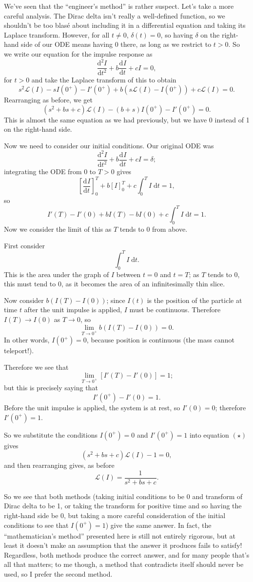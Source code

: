 \documentclass{article}
\newcommand{\deriv}[3][]{\frac{\mathrm{d}^{#1}#2}{\mathrm{d}#3^{#1}}}
\newcommand{\diff}{\;\mathrm{d}}
\begin{document}
We've seen that the ``engineer's method'' is rather suspect. Let's take a more careful analysis. The Dirac delta isn't really a well-defined function, so we shouldn't be too blas{\'e} about including it in a differential equation and taking its Laplace transform. However, for all $t\neq 0$, $\delta(t)=0$, so having $\delta$ on the right-hand side of our ODE means having 0 there, as long as we restrict to $t>0$. So we write our equation for the impulse response as
\[\deriv[2]{I}{t}+b\deriv{I}{t}+cI=0,\]
for $t>0$ and take the Laplace transform of this to obtain
\[s^2\mathcal{L}(I)-sI(0^+)-I'(0^+)+b\left(s\mathcal{L}(I)-I(0^+)\right) + c\mathcal{L}(I)=0.\]
Rearranging as before, we get
\begin{equation}
(s^2+bs+c)\mathcal{L}(I)-(b+s)I(0^+) - I'(0^+)=0.\tag{$\star$}
\end{equation}
This is almost the same equation as we had previously, but we have 0 instead of 1 on the right-hand side.

Now we need to consider our initial conditions. Our original ODE was
\[\deriv[2]{I}{t}+b\deriv{I}{t}+cI=\delta;\]
integrating the ODE from 0 to $T>0$ gives
\[\left[\deriv{I}{t}\right]_0^T + b\left[I\right]_0^T + c\int_0^T I\diff t=1,\]
so
\[I'(T)-I'(0)+bI(T)-bI(0)+c\int_0^T I\diff t = 1.\]
Now we consider the limit of this as $T$ tends to 0 from above.

First consider
\[\int_0^T I\diff t.\]
This is the area under the graph of $I$ between $t=0$ and $t=T$; as $T$ tends to 0, this must tend to 0, as it becomes the area of an infinitesimally thin slice.

Now consider $b(I(T)-I(0))$; since $I(t)$ is the position of the particle at time $t$ after the unit impulse is applied, $I$ must be continuous. Therefore $I(T)\to I(0)$ as $T\to 0$, so
\[\lim_{T\to 0^+} b(I(T)-I(0)) = 0.\]
In other words, $I(0^+)=0$, because position is continuous (the mass cannot teleport!).

Therefore we see that
\[\lim_{T\to 0^+} \left[I'(T)-I'(0)\right] = 1;\]
but this is precisely saying that
\[I'(0^+)-I'(0)=1.\]
Before the unit impulse is applied, the system is at rest, so $I'(0)=0$; therefore $I'(0^+)=1$.\medskip


So we substitute the conditions $I(0^+)=0$ and $I'(0^+)=1$ into equation $(\star)$ gives
\[(s^2+bs+c)\mathcal{L}(I)-1=0,\]
and then rearranging gives, as before
\[\mathcal{L}(I)=\frac{1}{s^2+bs+c}.\]\bigskip



So we see that both methods (taking initial conditions to be 0 and transform of Dirac delta to be 1, or taking the transform for positive time and so having the right-hand side be 0, but taking a more careful consideration of the initial conditions to see that $I(0^+)=1$) give the same answer. In fact, the ``mathematician's method'' presented here is still not entirely rigorous, but at least it doesn't make an assumption that the answer it produces fails to satisfy! Regardless, both methods produce the correct answer, and for many people that's all that matters; to me though, a method that contradicts itself should never be used, so I prefer the second method.
\end{document}
